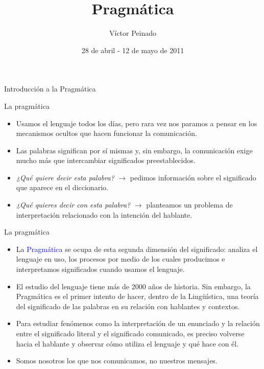 \documentclass{beamer}
\title[]{Pragmática}
\author[V. Peinado]{Víctor Peinado}
\institute[UCM]{
  \texttt{v.peinado@filol.ucm.es}\\[1ex]
  
  Grado de Logopedia, Universidad Complutense de Madrid\\[1ex]
}
\date[Febrero 2011]{28 de abril - 12 de mayo de 2011}
\begin{document}
\let\ipa\textipa
\let\it\textit


\begin{frame}[plain]
  \titlepage
\end{frame}


\begin{frame}[Parte 1]

\begin{center}
  \LARGE{Introducción a la Pragmática}
\end{center} 
\end{frame}

\begin{frame}{La pragmática}

\begin{itemize}
	\item Usamos el lenguaje todos los días, pero rara vez nos paramos a pensar en los mecanismos ocultos que hacen funcionar la comunicación.
	\item Las palabras significan por sí mismas y, sin embargo, la comunicación exige mucho más que intercambiar significados preestablecidos.
	\item \it{¿Qué quiere decir esta palabra?} $\rightarrow$ pedimos información sobre el significado que aparece en el diccionario.
	\item \it{¿Qué quieres decir con esta palabra?} $\rightarrow$ planteamos un problema de interpretación relacionado con la intención del hablante.
\end{itemize}

\end{frame}


\begin{frame}{La pragmática}

\begin{itemize}
	\item La \textcolor{blue}{Pragmática} se ocupa de esta segunda dimensión del significado: analiza el lenguaje en uso, los procesos por medio de los cuales producimos e interpretamos significados cuando usamos el lenguaje.
	\item El estudio del lenguaje tiene más de 2000 años de historia. Sin embargo, la Pragmática es el primer intento de hacer, dentro de la Lingüística, una teoría del significado de las palabras en su relación con hablantes y contextos.
	\item Para estudiar fenómenos como la interpretación de un enunciado y la relación entre el significado literal y el significado comunicado, es preciso volverse hacia el hablante y observar cómo utiliza el lenguaje y qué hace con él.
	\item Somos nosotros los que nos comunicamos, no nuestros mensajes.
\end{itemize} 

\end{frame}
\end{document}
